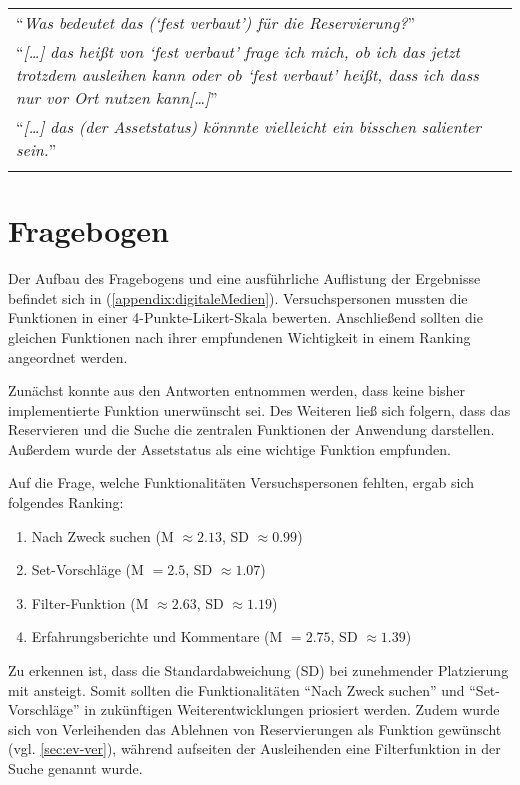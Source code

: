 \begin{longtable}{p{}} \arrayrulecolor{maincolor}\hline
        \enquote{\textit{Was bedeutet das (\enquote{fest verbaut}) für die Reservierung?}} \\
        \enquote{\textit{[\dots] das heißt von \enquote{fest verbaut} frage ich mich,
                        ob ich das jetzt trotzdem ausleihen kann oder ob \enquote{fest verbaut} heißt,
        dass ich dass nur vor Ort nutzen kann[\dots]}}                                     \\
        \enquote{\textit{[\dots] das (der Assetstatus) könnnte vielleicht ein bisschen
        salienter sein.}}                                                                  \\
        \arrayrulecolor{maincolor}\hline
\end{longtable}


\newpage
\section{Fragebogen}
Der Aufbau des Fragebogens und eine ausführliche Auflistung der Ergebnisse befindet sich in
(\ref{appendix:digitaleMedien}). Versuchspersonen mussten die Funktionen in einer
4-Punkte-Likert-Skala bewerten. Anschließend sollten die gleichen Funktionen nach ihrer empfundenen
Wichtigkeit in einem Ranking angeordnet werden.

Zunächst konnte aus den Antworten entnommen werden, dass keine bisher implementierte
Funktion unerwünscht sei. Des Weiteren ließ sich folgern, dass das Reservieren und die Suche die
zentralen Funktionen der Anwendung darstellen. Außerdem wurde der Assetstatus als eine wichtige
Funktion empfunden.

Auf die Frage, welche Funktionalitäten Versuchspersonen fehlten, ergab sich folgendes Ranking:
\begin{enumerate}
        \item Nach Zweck suchen (M \(\approx 2.13\), SD \(\approx 0.99\))
        \item Set-Vorschläge (M \( = 2.5\), SD \(\approx 1.07\))
        \item Filter-Funktion (M \( \approx 2.63\), SD \(\approx 1.19\))
        \item Erfahrungsberichte und Kommentare (M \( = 2.75\), SD \(\approx 1.39\))
\end{enumerate}

Zu erkennen ist, dass die Standardabweichung (SD) bei zunehmender Platzierung mit ansteigt. Somit
sollten die Funktionalitäten \enquote{Nach Zweck suchen} und \enquote{Set-Vorschläge}  in
zukünftigen Weiterentwicklungen priosiert werden.  Zudem wurde sich von Verleihenden das Ablehnen von
Reservierungen als Funktion gewünscht (vgl. \ref{sec:ev-ver}), während aufseiten der Ausleihenden
eine Filterfunktion in der Suche genannt wurde.

